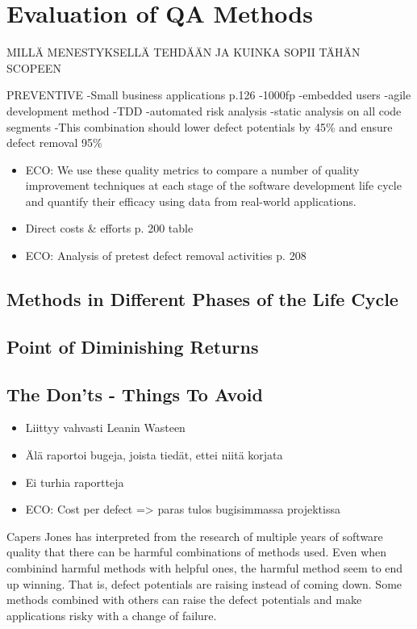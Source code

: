 
 \section{Evaluation of QA Methods}
 
MILLÄ MENESTYKSELLÄ TEHDÄÄN JA KUINKA SOPII TÄHÄN SCOPEEN



PREVENTIVE
-Small business applications p.126
	-1000fp
	-embedded users
	-agile development method
	-TDD
	-automated risk analysis
	-static analysis on all code segments
	-This combination should lower defect potentials by 45\% and ensure defect removal 95\%




 \begin{itemize}
  
 \item ECO: We use these quality metrics to compare a number of quality improvement techniques at each stage of the software development life cycle and quantify their efficacy using data from real-world applications.
 
 \item Direct costs \& efforts p. 200 table

 \item ECO: Analysis of pretest defect removal activities p. 208

 \end{itemize}
 
 \subsection{Methods in Different Phases of the Life Cycle}
 
 \subsection{Point of Diminishing Returns}
 
 \subsection{The Don'ts - Things To Avoid}
 
 \begin{itemize}
 
 \item Liittyy vahvasti Leanin Wasteen
 \item Älä raportoi bugeja, joista tiedät, ettei niitä korjata
 \item Ei turhia raportteja
 \item ECO: Cost per defect => paras tulos bugisimmassa projektissa
 
 \end{itemize}


Capers Jones has interpreted from the research of multiple years of software quality that there can be harmful combinations of methods used. Even when combinind harmful methods with helpful ones, the harmful method seem to end up winning. That is, defect potentials are raising instead of coming down. Some methods combined with others can raise the defect potentials and make applications risky with a change of failure.
